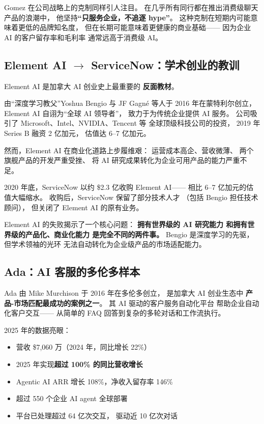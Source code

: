 Gomez 在公司战略上的克制同样引人注目。
在几乎所有同行都在推出消费级聊天产品的浪潮中，
他坚持\textbf{``只服务企业，不追逐 hype''}。
这种克制在短期内可能意味着更低的品牌知名度，
但在长期可能意味着更健康的商业基础——
因为企业 AI 的客户留存率和毛利率
通常远高于消费级 AI。

\subsection{Element AI $\to$ ServiceNow：学术创业的教训}

Element AI 是加拿大 AI 创业史上最重要的
\textbf{反面教材}。

由``深度学习教父''Yoshua Bengio
与 JF Gagn\'{e} 等人于 2016 年在蒙特利尔创立，
Element AI 自诩为``全球 AI 领导者''，
致力于为传统企业提供 AI 服务。
公司吸引了 Microsoft、Intel、NVIDIA、Tencent 等
全球顶级科技公司的投资，
2019 年 Series B 融资 2 亿加元，
估值达 6--7 亿加元。

然而，Element AI 在商业化道路上步履维艰：
运营成本高企、营收微薄、
两个旗舰产品的开发严重受挫、
将 AI 研究成果转化为企业可用产品的能力严重不足。

2020 年底，ServiceNow 以约 \$2.3 亿收购 Element AI——
相比 6--7 亿加元的估值大幅缩水。
收购后，ServiceNow 保留了部分技术人才
（包括 Bengio 担任技术顾问），
但关闭了 Element AI 的原有业务。

Element AI 的失败揭示了一个核心问题：
\textbf{拥有世界级的 AI 研究能力
和拥有世界级的产品化、商业化能力
是完全不同的两件事。}
Bengio 是深度学习的先驱，
但学术领袖的光环
无法自动转化为企业级产品的市场适配能力。

\subsection{Ada：AI 客服的多伦多样本}

Ada 由 Mike Murchison 于 2016 年在多伦多创立，
是加拿大 AI 创业生态中
\textbf{产品-市场匹配最成功的案例之一}。
其 AI 驱动的客户服务自动化平台
帮助企业自动化客户交互——
从简单的 FAQ 回答到复杂的多轮对话和工作流执行。

2025 年的数据亮眼：
\begin{itemize}[noitemsep]
  \item 营收 \$7,060 万（2024 年，同比增长 22\%）
  \item 2025 年实现\textbf{超过 100\% 的同比营收增长}
  \item Agentic AI ARR 增长 108\%，净收入留存率 146\%
  \item 超过 550 个企业 AI agent 全球部署
  \item 平台已处理超过 64 亿次交互，
        驱动近 10 亿次对话
\end{itemize}

